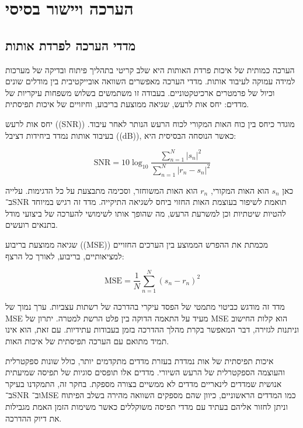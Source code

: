 \chapter{הערכה ויישור בסיסי}

\section{מדדי הערכה לפרדת אותות}

הערכה כמותית של איכות פרדת האותות היא שלב קריטי בתהליך פיתוח ובדיקה של מערכות למידה עמוקה לעיבוד אותות. מדדי הערכה מאפשרים השוואה אובייקטיבית בין מודלים שונים וכיול של פרמטרים ארכיטקטוניים. בעבודה זו משתמשים בשלוש משפחות עיקריות של מדדים: יחס אות לרעש, שגיאה ממוצעת בריבוע, וחיזויים של איכות תפיסתית.

יחס אות לרעש ((\textenglish{SNR})) מוגדר כיחס בין כוח האות המקורי לכוח הרעש הנותר לאחר עיבוד. בעיבוד אותות נמדד ביחידות דציבל ((\textenglish{dB})), כאשר הנוסחה הבסיסית היא:

\begin{equation}
\mathrm{SNR} = 10 \log_{10} \frac{\sum_{n=1}^{N} |s_n|^2}{\sum_{n=1}^{N} |r_n - s_n|^2}
\end{equation}

כאן \(s_n\) הוא האות המקורי, \(r_n\) הוא האות המשוחזר, וסכימה מתבצעת על כל הדגימות. עלייה ב־\textenglish{SNR} תואמת לשיפור בעוצמת האות החזוי ביחס לשגיאה התיקייה. מדד זה רגיש במיוחד להטיות שיטתיות וכן למשרעת הרעש, מה שהופך אותו לשימושי להערכה של ביצועי מודל בתנאים רועשים.

שגיאה ממוצעת בריבוע ((\textenglish{MSE})) מכמתת את ההפרש הממוצע בין הערכים החזויים למציאותיים, בריבוע, לאורך כל הרצף:

\begin{equation}
\mathrm{MSE} = \frac{1}{N} \sum_{n=1}^{N} (s_n - r_n)^2
\end{equation}

מדד זה מודגש כביטוי מתמטי של הפסד עיקרי בהדרכה של רשתות עצביות. ערך נמוך של \textenglish{MSE} מעיד על התאמה הדוקה בין פלט הרשת למטרה. יתרון של \textenglish{MSE} הוא קלות החישוב וניתנות לגזירה, דבר המאפשר בקרת מהלך ההדרכה בזמן בעבודות עתידיות. עם זאת, הוא אינו תמיד מתואם עם הערכה תפיסתית של איכות האות.

איכות תפיסתית של אות נמדדת בעזרת מדדים מתקדמים יותר, כולל שונות ספקטרלית והעוצמה הספקטרלית של הרעש השיורי. מדדים אלו תופסים סוגיות של תפיסה שמיעתית אנושית שמדדים לינאריים מדדים לא ממשיים בצורה מספקת. בחקר זה, התמקדנו בעיקר ב־\textenglish{SNR} וב־\textenglish{MSE} כמו המדדים הראשוניים, כיוון שהם מספקים השוואה מהירה בשלב הפיתוח וניתן לחזור אליהם בעתיד עם מדדי תפיסה משוקללים כאשר משימות הזמן האמת מגבילות את דיוק ההדרכה.

